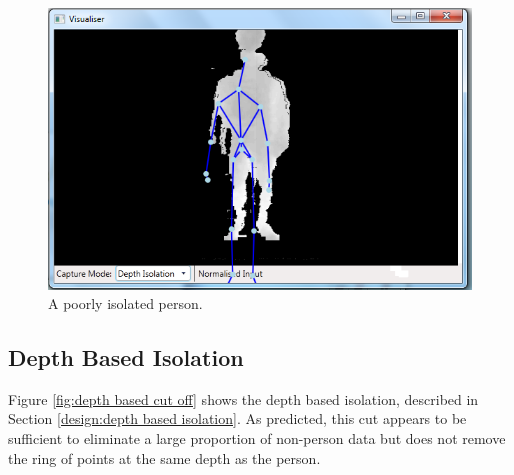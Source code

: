 \begin{figure}[h]
\begin{center}
\includegraphics[scale=0.4]{images/parse5} 
\end{center}
\caption{A poorly isolated person.}
\label{fig:a poorly isolated person}
\end{figure} 

\subsection{Depth Based Isolation}
\label{imp:depth based isolation}
Figure \ref{fig:depth based cut off} shows the depth based isolation, described in Section \ref{design:depth based isolation}. As predicted, this cut appears to be sufficient to eliminate a large proportion of non-person data but does not remove the ring of points at the same depth as the person.\\

